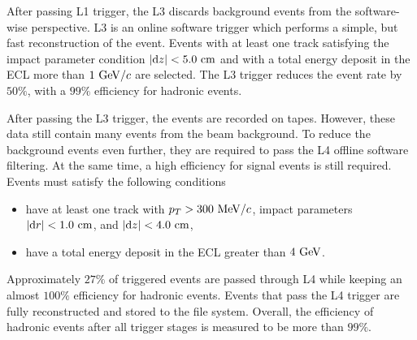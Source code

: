 After passing L1 trigger, the L3 discards background events from the software-wise perspective. L3 is an online software trigger which performs a simple, but fast reconstruction of the event. Events with at least one track satisfying the impact parameter condition $\vert\mathrm{d}z \vert < 5.0\mathrm{~cm}$ and with a total energy deposit in the ECL more than $1\mathrm{~GeV}/c$ are selected. The L3 trigger reduces the event rate by $50\%$, with a $99\%$ efficiency for hadronic events.

After passing the L3 trigger, the events are recorded on tapes. However, these data still contain many events from the beam background. To reduce the background events even further, they are required to pass the L4 offline software filtering. At the same time, a high efficiency for signal events is still required. Events must satisfy the following conditions
\begin{itemize}
	\item have at least one track with $p_T > 300\mathrm{~MeV}/c$, impact parameters $\vert \mathrm{d}r \vert < 1.0\mathrm{~cm}$, and $\vert \mathrm{d}z \vert < 4.0\mathrm{~cm}$,
	\item have a total energy deposit in the ECL greater than $4\mathrm{~GeV}$.
\end{itemize}
Approximately $27\%$ of triggered events are passed through L4 while keeping an almost $100\%$ efficiency for hadronic events. Events that pass the L4 trigger are fully reconstructed and stored to the file system. Overall, the efficiency of hadronic events after all trigger stages is measured to be more than $99\%$.



